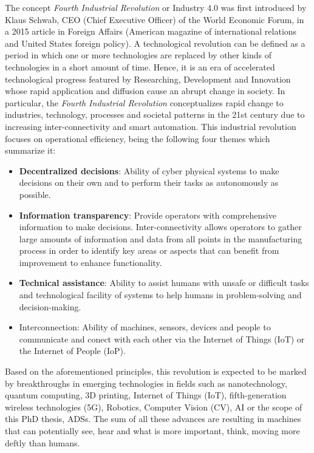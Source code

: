The concept \textit{Fourth Industrial Revolution} or Industry 4.0  was first introduced by Klaus Schwab, CEO (Chief Executive Officer) of the World Economic Forum, in a 2015 article in Foreign Affairs (American magazine of international relations and United States foreign policy). A technological revolution can be defined as a period in which one or more technologies are replaced by other kinds of technologies in a short amount of time. Hence, it is an era of accelerated technological progress featured by Researching, Development and Innovation whose rapid application and diffusion cause an abrupt change in society. In particular, the \textit{Fourth Industrial Revolution} conceptualizes rapid change to industries, technology, processes and societal patterns in the 21st century due to increasing inter-connectivity and smart automation. This industrial revolution focuses on operational efficiency, being the following four themes which summarize it: 

\begin{itemize}
	\item \textbf{Decentralized decisions}: Ability of cyber physical systems to make decisions on their own and to perform their tasks as autonomously as possible.
	\item \textbf{Information transparency}: Provide operators with comprehensive information to make decisions. Inter-connectivity allows operators to gather large amounts of information and data from all points in the manufacturing process in order to identify key areas or aspects that can benefit from improvement to enhance functionality.
	\item \textbf{Technical assistance}: Ability to assist humans with unsafe or difficult tasks and technological facility of systems to help humans in problem-solving and decision-making.
	\item Interconnection: Ability of machines, sensors, devices and people to communicate and conect with each other via the Internet of Things (IoT) or the Internet of People (IoP).
\end{itemize}

Based on the aforementioned principles, this revolution is expected to be marked by breakthroughs in emerging technologies in fields such as nanotechnology, quantum computing, 3D printing, Internet of Things (IoT), fifth-generation wireless technologies (5G), Robotics, Computer Vision (CV), \ac{AI} or the scope of this PhD thesis, \acp{ADS}. The sum of all these advances are resulting in machines that can potentially see, hear and what is more important, think, moving more deftly than humans. 


